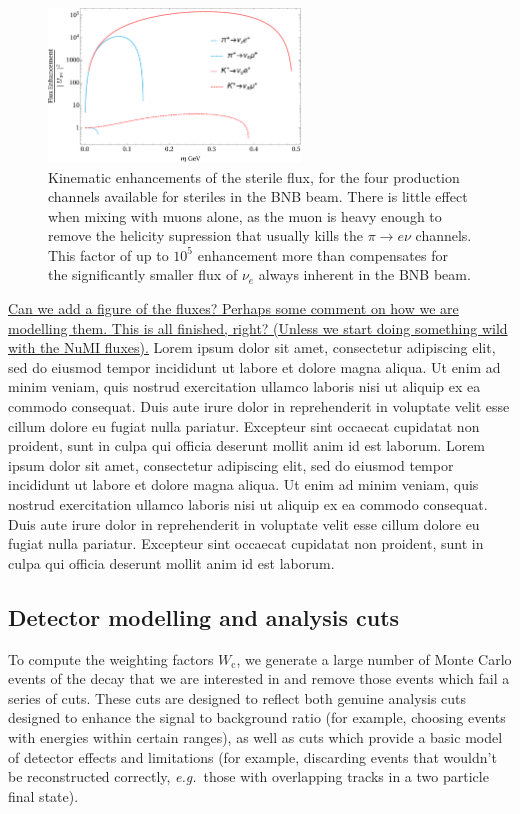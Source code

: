 \documentclass[11pt, a4paper]{article}
\def\eg{\emph{e.g.}}
\newcommand{\lorem}{ \textcolor[rgb]{0.8,0.8,0.8}{Lorem ipsum dolor sit amet, consectetur
adipiscing elit, sed do eiusmod tempor incididunt ut labore et dolore magna
aliqua. Ut enim ad minim veniam, quis nostrud exercitation ullamco laboris nisi
ut aliquip ex ea commodo consequat. Duis aute irure dolor in reprehenderit in
voluptate velit esse cillum dolore eu fugiat nulla pariatur. Excepteur sint
occaecat cupidatat non proident, sunt in culpa qui officia deserunt mollit anim
id est laborum.}}
\newcommand{\newtext}[2]{\textcolor{#1}{\ul{#2}}}
\begin{document}
\begin{figure}[t]
\center
\includegraphics[width=0.6\textwidth]{figures/BNB_flux_enhancement.pdf}

\caption{\label{fig:flux_enhancement} Kinematic enhancements of the sterile flux, for the four production channels available for steriles in the BNB beam. There is little effect when mixing with muons alone, as the muon is heavy enough to remove the helicity supression that usually kills the $\pi\rightarrow e \nu$ channels. This factor of up to $10^5$ enhancement more than compensates for the significantly smaller flux of $\nu_e$ always inherent in the BNB beam.}

\end{figure}



%
\newtext{PB}{Can we add a figure of the fluxes? Perhaps some comment on how we
are modelling them. This is all finished, right? (Unless we start doing
something wild with the NuMI fluxes).}
%
\lorem\lorem 

\subsection{Detector modelling and analysis cuts}

To compute the weighting factors $W_\text{c}$, we generate a large number of
Monte Carlo events of the decay that we are interested in and remove those
events which fail a series of cuts. These cuts are designed to reflect both
genuine analysis cuts designed to enhance the signal to background ratio (for
example, choosing events with energies within certain ranges), as well as cuts
which provide a basic model of detector effects and limitations (for example,
discarding events that wouldn't be reconstructed correctly, \eg\ those with
overlapping tracks in a two particle final state).
\end{document}
